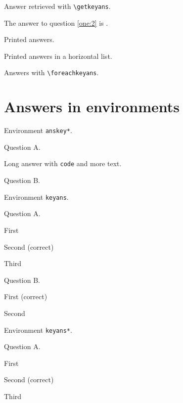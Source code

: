 \documentclass{article}
\begin{document}
Answer retrieved with \texttt{\textbackslash getkeyans}.

The answer to question \ref{one:2} is .

Printed answers.


Printed answers in a horizontal list.


Answers with \texttt{\textbackslash foreachkeyans}.


\section{Answers in environments}

Environment \texttt{anskey*}.

\begin{enumext}[save-ans=two]
  \item Question A.
    \begin{anskey*}
      Long answer with \verb+code+ and more text.
    \end{anskey*}
  \item Question B. 
\end{enumext}


Environment \texttt{keyans}.

\begin{enumext}[save-ans=three]
  \item Question A.
    \begin{keyans}
      \item First
      \item* Second (correct)
      \item Third
    \end{keyans}
  \item Question B.
    \begin{keyans}
      \item*[some note] First (correct)
      \item Second
    \end{keyans}
\end{enumext}


Environment \texttt{keyans*}.

\begin{enumext}[save-ans=four]
  \item Question A.
    \begin{keyans*}
      \item First
      \item* Second (correct)
      \item Third
    \end{keyans*}
\end{enumext}
\end{document}
